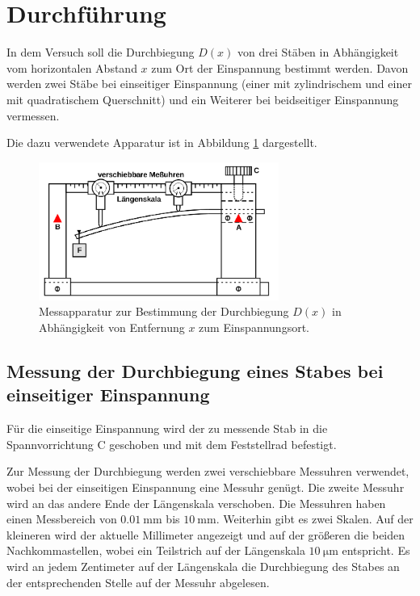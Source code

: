 \section{Durchführung}
\label{sec:Durchführung}

In dem Versuch soll die Durchbiegung $D(x)$ von drei Stäben in Abhängigkeit vom horizontalen
Abstand $x$ zum Ort der Einspannung bestimmt werden.
Davon werden zwei Stäbe bei einseitiger Einspannung (einer mit zylindrischem und einer mit
quadratischem Querschnitt) und ein Weiterer bei beidseitiger Einspannung vermessen.

Die dazu verwendete Apparatur ist in Abbildung \ref{fig:aufbauamk} dargestellt.
\begin{figure}
	\centering
	\includegraphics[width=0.7\textwidth]{Bilder/Aufbau_Messung.png}
	\caption{Messapparatur zur Bestimmung der Durchbiegung $D(x)$ in Abhängigkeit von
		Entfernung $x$ zum Einspannungsort. \cite{Anleitung}}
	\label{fig:aufbauamk}
\end{figure}
\subsection{Messung der Durchbiegung eines Stabes bei einseitiger Einspannung}
Für die einseitige Einspannung wird der zu messende Stab in die Spannvorrichtung C geschoben und mit dem Feststellrad befestigt.

Zur Messung der Durchbiegung werden zwei verschiebbare Messuhren verwendet, wobei bei der
einseitigen Einspannung eine Messuhr genügt. Die zweite Messuhr wird an das andere Ende der
Längenskala verschoben.
Die Messuhren haben einen Messbereich von $\SI{0,01}{\milli\meter}$ bis $\SI{10}{\milli\meter}$.
Weiterhin gibt es zwei Skalen. Auf der kleineren wird der aktuelle Millimeter angezeigt und
auf der größeren die beiden Nachkommastellen, wobei ein Teilstrich auf der Längenskala
$\SI{10}{\micro\meter}$ entspricht.
Es wird an jedem Zentimeter auf der Längenskala die Durchbiegung des Stabes an der
entsprechenden Stelle auf der Messuhr abgelesen.

